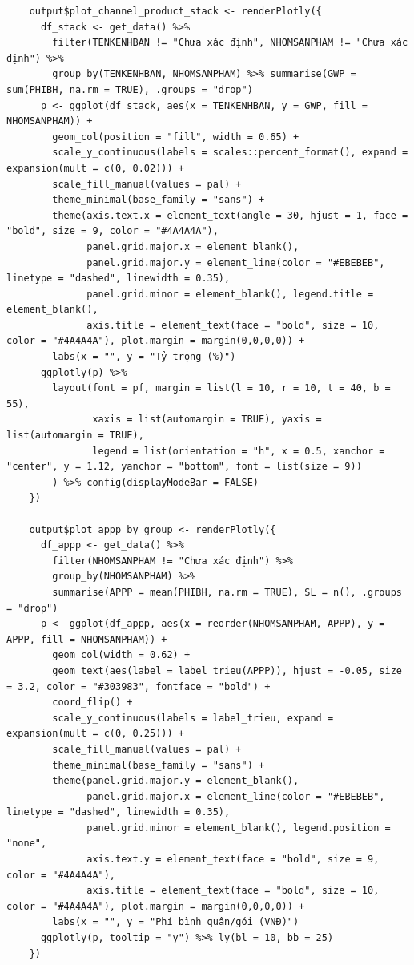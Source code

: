 \documentclass[12pt, a4paper]{article}
\begin{document}
\begin{lstlisting}
    output$plot_channel_product_stack <- renderPlotly({
      df_stack <- get_data() %>%
        filter(TENKENHBAN != "Chưa xác định", NHOMSANPHAM != "Chưa xác định") %>%
        group_by(TENKENHBAN, NHOMSANPHAM) %>% summarise(GWP = sum(PHIBH, na.rm = TRUE), .groups = "drop")
      p <- ggplot(df_stack, aes(x = TENKENHBAN, y = GWP, fill = NHOMSANPHAM)) +
        geom_col(position = "fill", width = 0.65) +
        scale_y_continuous(labels = scales::percent_format(), expand = expansion(mult = c(0, 0.02))) +
        scale_fill_manual(values = pal) +
        theme_minimal(base_family = "sans") +
        theme(axis.text.x = element_text(angle = 30, hjust = 1, face = "bold", size = 9, color = "#4A4A4A"),
              panel.grid.major.x = element_blank(),
              panel.grid.major.y = element_line(color = "#EBEBEB", linetype = "dashed", linewidth = 0.35),
              panel.grid.minor = element_blank(), legend.title = element_blank(),
              axis.title = element_text(face = "bold", size = 10, color = "#4A4A4A"), plot.margin = margin(0,0,0,0)) +
        labs(x = "", y = "Tỷ trọng (%)")
      ggplotly(p) %>%
        layout(font = pf, margin = list(l = 10, r = 10, t = 40, b = 55),
               xaxis = list(automargin = TRUE), yaxis = list(automargin = TRUE),
               legend = list(orientation = "h", x = 0.5, xanchor = "center", y = 1.12, yanchor = "bottom", font = list(size = 9))
        ) %>% config(displayModeBar = FALSE)
    })

    output$plot_appp_by_group <- renderPlotly({
      df_appp <- get_data() %>%
        filter(NHOMSANPHAM != "Chưa xác định") %>%
        group_by(NHOMSANPHAM) %>%
        summarise(APPP = mean(PHIBH, na.rm = TRUE), SL = n(), .groups = "drop")
      p <- ggplot(df_appp, aes(x = reorder(NHOMSANPHAM, APPP), y = APPP, fill = NHOMSANPHAM)) +
        geom_col(width = 0.62) +
        geom_text(aes(label = label_trieu(APPP)), hjust = -0.05, size = 3.2, color = "#303983", fontface = "bold") +
        coord_flip() +
        scale_y_continuous(labels = label_trieu, expand = expansion(mult = c(0, 0.25))) +
        scale_fill_manual(values = pal) +
        theme_minimal(base_family = "sans") +
        theme(panel.grid.major.y = element_blank(),
              panel.grid.major.x = element_line(color = "#EBEBEB", linetype = "dashed", linewidth = 0.35),
              panel.grid.minor = element_blank(), legend.position = "none",
              axis.text.y = element_text(face = "bold", size = 9, color = "#4A4A4A"),
              axis.title = element_text(face = "bold", size = 10, color = "#4A4A4A"), plot.margin = margin(0,0,0,0)) +
        labs(x = "", y = "Phí bình quân/gói (VNĐ)")
      ggplotly(p, tooltip = "y") %>% ly(bl = 10, bb = 25)
    })


\end{lstlisting}
\end{document}
